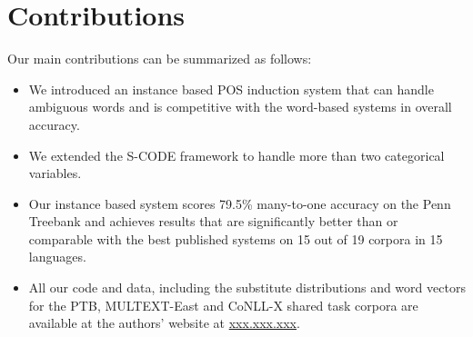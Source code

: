 \section{Contributions}
\label{sec:contrib}
Our main contributions can be summarized as follows:
\begin{itemize}
\item We introduced an instance based POS induction system that can
  handle ambiguous words and is competitive with the word-based systems in
  overall accuracy.  
\item We extended the S-CODE framework to handle more than two categorical
  variables. 
\item Our instance based system scores 79.5\% many-to-one accuracy on
  the Penn Treebank and achieves results that are significantly better
  than or comparable with the best published systems on 15 out of 19
  corpora in 15 languages.
\item All our code and data, including the substitute distributions
  and word vectors for the PTB, MULTEXT-East and CoNLL-X shared task
  corpora are available at the authors' website at
  \mbox{\url{xxx.xxx.xxx}}.
\end{itemize}

